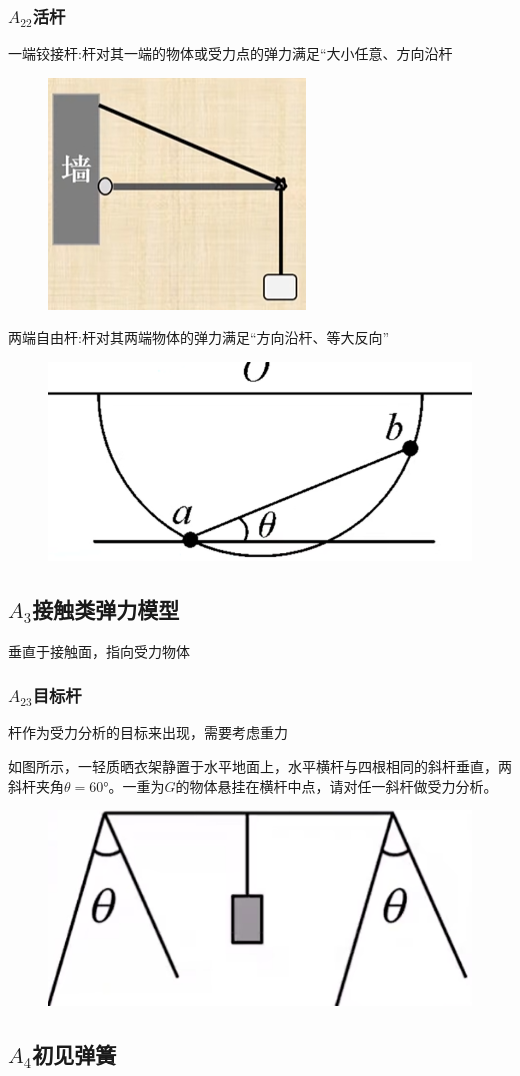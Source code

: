 \documentclass[lang=cn,10pt]{elegantbook}
\begin{document}
	\subsubsection{$A_{22}$活杆}
	$\text{一端铰接杆:杆对其一端的物体或受力点的弹力满足“大小任意、方向沿杆}$
	\begin{figure}[H]
		\centering
		\includegraphics[width=0.2\linewidth]{image/16}
	\end{figure}
	
	$\text{两端自由杆:杆对其两端物体的弹力满足“方向沿杆、等大反向”}$
	\begin{figure}[H]
		\centering
		\includegraphics[width=0.3\linewidth]{image/21}
	\end{figure}
	
	\subsection{$A_{3}$接触类弹力模型}
	垂直于接触面，指向受力物体
	\subsubsection{$A_{23}$目标杆}
	杆作为受力分析的目标来出现，需要考虑重力
	\begin{example}
		如图所示，一轻质晒衣架静置于水平地面上，水平横杆与四根相同的斜杆垂直，两
		斜杆夹角$\theta=60°$。一重为$G$的物体悬挂在横杆中点，请对任一斜杆做受力分析。
		\begin{figure}[H]
			\centering
			\includegraphics[width=0.4\linewidth]{image/12}
		\end{figure}
	\end{example}
	\vspace{2cm}
	\subsection{$A_{4}$初见弹簧}
\end{document}
